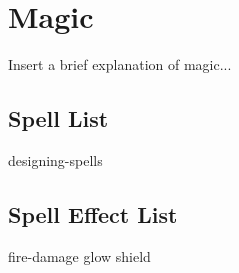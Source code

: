 \chapter{Magic}\label{magic}

\begin{multicols*}{2}
    Insert a brief explanation of magic...
    
    \section{Spell List}
    
    {designing-spells}
	
    \section{Spell Effect List}
    {fire-damage}
    {glow}
    {shield}

\end{multicols*}
